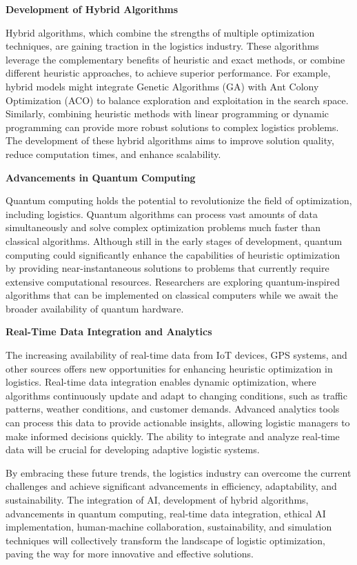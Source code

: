 \documentclass{article}
\begin{document}
    \textbf{Development of Hybrid Algorithms}

    Hybrid algorithms, which combine the strengths of multiple optimization techniques, are gaining traction in the logistics industry. These algorithms leverage the complementary benefits of heuristic and exact methods, or combine different heuristic approaches, to achieve superior performance. For example, hybrid models might integrate Genetic Algorithms (GA) with Ant Colony Optimization (ACO) to balance exploration and exploitation in the search space. Similarly, combining heuristic methods with linear programming or dynamic programming can provide more robust solutions to complex logistics problems. The development of these hybrid algorithms aims to improve solution quality, reduce computation times, and enhance scalability. \cite{vidal2013}

    \textbf{Advancements in Quantum Computing}

    Quantum computing holds the potential to revolutionize the field of optimization, including logistics. Quantum algorithms can process vast amounts of data simultaneously and solve complex optimization problems much faster than classical algorithms. Although still in the early stages of development, quantum computing could significantly enhance the capabilities of heuristic optimization by providing near-instantaneous solutions to problems that currently require extensive computational resources. Researchers are exploring quantum-inspired algorithms that can be implemented on classical computers while we await the broader availability of quantum hardware. \cite{toth2014vehicle}

    \textbf{Real-Time Data Integration and Analytics}

    The increasing availability of real-time data from IoT devices, GPS systems, and other sources offers new opportunities for enhancing heuristic optimization in logistics. Real-time data integration enables dynamic optimization, where algorithms continuously update and adapt to changing conditions, such as traffic patterns, weather conditions, and customer demands. Advanced analytics tools can process this data to provide actionable insights, allowing logistic managers to make informed decisions quickly. The ability to integrate and analyze real-time data will be crucial for developing adaptive logistic systems. \cite{toth2014vehicle}


    By embracing these future trends, the logistics industry can overcome the current challenges and achieve significant advancements in efficiency, adaptability, and sustainability. The integration of AI, development of hybrid algorithms, advancements in quantum computing, real-time data integration, ethical AI implementation, human-machine collaboration, sustainability, and simulation techniques will collectively transform the landscape of logistic optimization, paving the way for more innovative and effective solutions.
\end{document}
